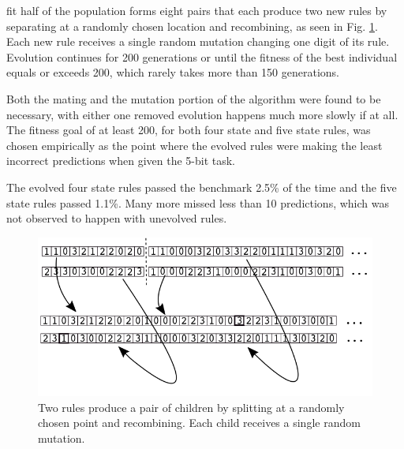 \documentclass{elsarticle}
\begin{document}
\begin{multicols}{2}
             fit half of the population forms eight pairs that each produce two 
             new rules by separating at a randomly chosen location and 
             recombining, as seen in Fig.  \ref{GA}. Each new rule receives a 
             single random mutation changing one digit of its rule.  Evolution 
             continues for 200 generations or until the fitness of the best 
             individual equals or exceeds 200, which rarely takes more than 150 
             generations.  \par Both the mating and the mutation portion of the 
             algorithm were found to be necessary, with either one removed 
             evolution happens much more slowly if at all. The fitness goal of 
             at least 200, for both four state and five state rules, was chosen 
             empirically as the point where the evolved rules were making the 
             least incorrect predictions when given the 5-bit task.  \par
     The evolved four state rules passed the benchmark 2.5\% of the time and 
     the five state rules passed 1.1\%. Many more missed less than 10 
     predictions, which was not observed to happen with unevolved rules.




\begin{figure}[H]
  \centering
    \includegraphics[width=\linewidth]{GA.png}
  \caption{Two rules produce a pair of children by splitting at a randomly 
      chosen point and recombining. Each child receives a single random 
          mutation.}
  \label{GA}
  \end{figure}


\end{multicols}
\end{document}
